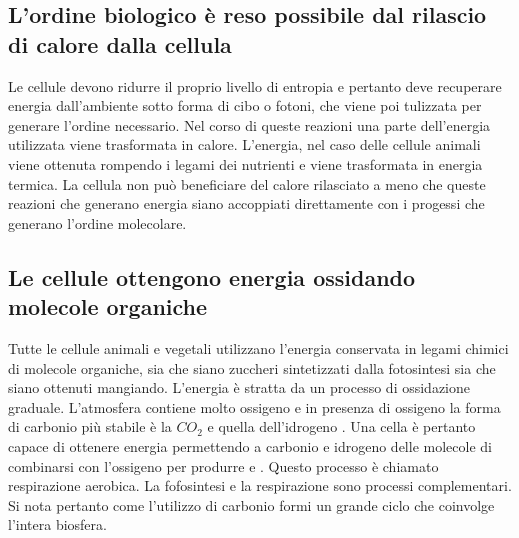 \subsection{L'ordine biologico \`e reso possibile dal rilascio di calore dalla cellula}
Le cellule devono ridurre il proprio livello di entropia e pertanto deve recuperare energia dall'ambiente sotto forma di cibo o fotoni, che viene poi tulizzata per generare l'ordine
necessario. Nel corso di queste reazioni una parte dell'energia utilizzata viene trasformata in calore. L'energia, nel caso delle cellule animali viene ottenuta rompendo i legami dei 
nutrienti e viene trasformata in energia termica. La cellula non pu\`o beneficiare del calore rilasciato a meno che queste reazioni che generano energia siano accoppiati direttamente
con i progessi che generano l'ordine molecolare. 
\subsection{Le cellule ottengono energia ossidando molecole organiche}
Tutte le cellule animali e vegetali utilizzano l'energia conservata in legami chimici di molecole organiche, sia che siano zuccheri sintetizzati dalla fotosintesi sia che siano ottenuti
mangiando. L'energia \`e stratta da un processo di ossidazione graduale. L'atmosfera contiene molto ossigeno e in presenza di ossigeno la forma di carbonio pi\`u stabile \`e la $CO_2$ e
quella dell'idrogeno . Una cella \`e pertanto capace di ottenere energia permettendo a carbonio e idrogeno delle molecole di combinarsi con l'ossigeno per produrre  e 
. Questo processo \`e chiamato respirazione aerobica. La fofosintesi e la respirazione sono processi complementari. Si nota pertanto come l'utilizzo di carbonio formi un grande 
ciclo che coinvolge l'intera biosfera. 
